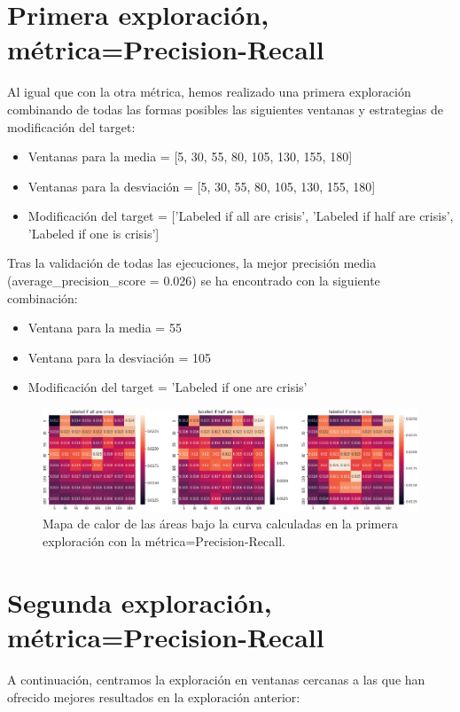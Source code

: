 \documentclass[a4paper,12pt,twoside,oldfontcommands]{memoir}
\begin{document}
\section{Primera exploración, métrica=Precision-Recall}

Al igual que con la otra métrica, hemos realizado una primera exploración combinando de todas las formas posibles las siguientes ventanas y estrategias de modificación del target: 
\begin{itemize}
    \item Ventanas para la media = [5, 30, 55, 80, 105, 130, 155, 180]
    \item Ventanas para la desviación = [5, 30, 55, 80, 105, 130, 155, 180]
    \item Modificación del target = ['Labeled if all are crisis', 'Labeled if half are crisis', 'Labeled if one is crisis']
\end{itemize}

Tras la validación de todas las ejecuciones, la mejor precisión media (average\_precision\_score = 0.026) se ha encontrado con la siguiente combinación: 
\begin{itemize}
    \item Ventana para la media = 55
    \item Ventana para la desviación = 105
    \item Modificación del target = 'Labeled if one are crisis'
\end{itemize}

\begin{figure}
    \centering
    \includegraphics[width=1\textwidth]{images/heatmap4.png}
    \caption{Mapa de calor de las áreas bajo la curva calculadas en la primera exploración con la métrica=Precision-Recall.}
    \label{fig:heatmap4}
\end{figure}

\section{Segunda exploración, métrica=Precision-Recall}

A continuación, centramos la exploración en ventanas cercanas a las que han ofrecido mejores resultados en la exploración anterior:
\end{document}
